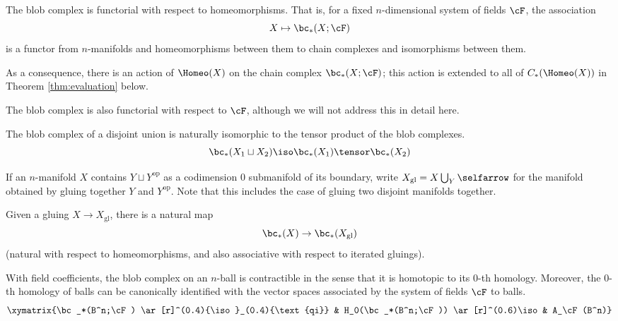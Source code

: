\begin{property}[Functoriality]
\label{property:functoriality}%
The blob complex is functorial with respect to homeomorphisms.
That is, 
for a fixed $n$-dimensional system of fields $\cF$, the association
\begin{equation*}
X \mapsto \bc_*(X; \cF)
\end{equation*}
is a functor from $n$-manifolds and homeomorphisms between them to chain 
complexes and isomorphisms between them.
\end{property}
As a consequence, there is an action of $\Homeo(X)$ on the chain complex $\bc_*(X; \cF)$; 
this action is extended to all of $C_*(\Homeo(X))$ in Theorem \ref{thm:evaluation} below.

The blob complex is also functorial with respect to $\cF$, 
although we will not address this in detail here.

\begin{property}
\label{property:disjoint-union}
The blob complex of a disjoint union is naturally isomorphic to the tensor product of the blob complexes.
\begin{equation*}
\bc_*(X_1 \du X_2) \iso \bc_*(X_1) \tensor \bc_*(X_2)
\end{equation*}
\end{property}

If an $n$-manifold $X$ contains $Y \sqcup Y^\text{op}$ as a codimension $0$ submanifold of its boundary, 
write $X_\text{gl} = X \bigcup_{Y}\selfarrow$ for the manifold obtained by gluing together $Y$ and $Y^\text{op}$.
Note that this includes the case of gluing two disjoint manifolds together.
\begin{property}
\label{property:gluing-map}%
Given a gluing $X \to X_\mathrm{gl}$, there is
a natural map
\[
	\bc_*(X) \to \bc_*(X_\mathrm{gl}) 
\]
(natural with respect to homeomorphisms, and also associative with respect to iterated gluings).
\end{property}

\begin{property}[Contractibility]
\label{property:contractibility}%
With field coefficients, the blob complex on an $n$-ball is contractible in the sense 
that it is homotopic to its $0$-th homology.
Moreover, the $0$-th homology of balls can be canonically identified with the vector spaces 
associated by the system of fields $\cF$ to balls.
\begin{equation*}
\xymatrix{\bc_*(B^n;\cF) \ar[r]^(0.4){\iso}_(0.4){\text{qi}} & H_0(\bc_*(B^n;\cF)) \ar[r]^(0.6)\iso & A_\cF(B^n)}
\end{equation*}
\end{property}

